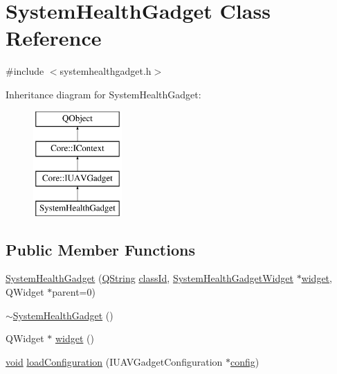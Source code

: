 \hypertarget{class_system_health_gadget}{\section{System\-Health\-Gadget Class Reference}
\label{class_system_health_gadget}
}


{\ttfamily \#include $<$systemhealthgadget.\-h$>$}

Inheritance diagram for System\-Health\-Gadget\-:\begin{figure}[H]
\begin{center}
\leavevmode
\includegraphics[height=4.000000cm]{class_system_health_gadget}
\end{center}
\end{figure}
\subsection*{Public Member Functions}
\begin{DoxyCompactItemize}
\item 
\hyperlink{group___system_health_plugin_ga87aa19680bf60a11eb4bd50c7df04992}{System\-Health\-Gadget} (\hyperlink{group___u_a_v_objects_plugin_gab9d252f49c333c94a72f97ce3105a32d}{Q\-String} \hyperlink{group___core_plugin_ga3878fde66a57220608960bcc3fbeef2c}{class\-Id}, \hyperlink{class_system_health_gadget_widget}{System\-Health\-Gadget\-Widget} $\ast$\hyperlink{group___system_health_plugin_ga3732714b9995ed833047882c7e723dc0}{widget}, Q\-Widget $\ast$parent=0)
\item 
\hyperlink{group___system_health_plugin_ga2212c1f05f7363aaf794f85bb9e7823c}{$\sim$\-System\-Health\-Gadget} ()
\item 
Q\-Widget $\ast$ \hyperlink{group___system_health_plugin_ga3732714b9995ed833047882c7e723dc0}{widget} ()
\item 
\hyperlink{group___u_a_v_objects_plugin_ga444cf2ff3f0ecbe028adce838d373f5c}{void} \hyperlink{group___system_health_plugin_gab876671a49f1abc2e7b8edbec5c0eaa1}{load\-Configuration} (I\-U\-A\-V\-Gadget\-Configuration $\ast$\hyperlink{deflate_8c_a4473b5227787415097004fd39f55185e}{config})
\end{DoxyCompactItemize}

